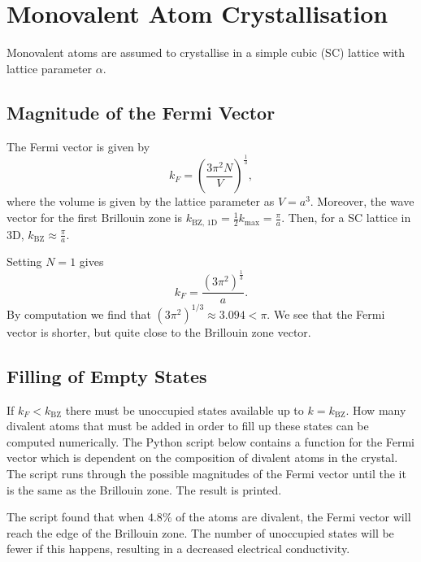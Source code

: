\documentclass[11pt]{amsart}
\begin{document}
\setcounter{section}{5}

\section{Monovalent Atom Crystallisation}
Monovalent atoms are assumed to crystallise in a simple cubic (SC) lattice with lattice parameter $\alpha$.

\subsection{Magnitude of the Fermi Vector}
The Fermi vector is given by 
\begin{equation}
k_F = \left(\frac{3\pi^2N}{V} \right)^{\frac{1}{3}},
\end{equation}
where the volume is given by the lattice parameter as $V=a^3$. Moreover, the wave vector for the first Brillouin zone is $k_{\text{BZ, 1D}} = \frac{1}{2}k_{\text{max}} = \frac{\pi}{a}$. Then, for a SC lattice in 3D, $k_{\text{BZ}} \approx \frac{\pi}{a}$.

Setting $N=1$ gives
\begin{equation}
k_F = \frac{(3\pi^2)^\frac{1}{3}}{a}.
\end{equation}
By computation we find that $(3\pi^2)^{1/3} \approx 3.094 < \pi$. We see that the Fermi vector is shorter, but quite close to the Brillouin zone vector.

\subsection{Filling of Empty States}
If $k_F < k_{\text{BZ}}$ there must be unoccupied states available up to $k=k_\text{BZ}$. How many divalent atoms that must be added in order to fill up these states can be computed numerically. The Python script below contains a function for the Fermi vector which is dependent on the composition of divalent atoms in the crystal. The script runs through the possible magnitudes of the Fermi vector until the it is the same as the Brillouin zone. The result is printed.



The script found that when $4.8\%$ of the atoms are divalent, the Fermi vector will reach the edge of the Brillouin zone. The number of unoccupied states will be fewer if this happens, resulting in a decreased electrical conductivity.
\end{document}
